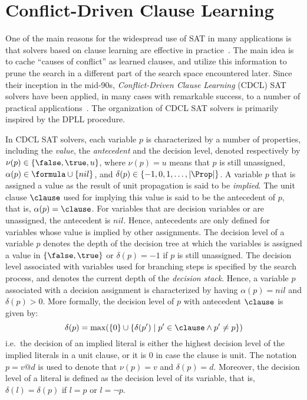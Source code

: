 \section{Conflict-Driven Clause Learning}%
\label{sec:cdcl}

One of the main reasons for the widespread use of SAT in many applications is
that solvers based on clause learning are effective in
practice~\cite{satchapter}. The main idea is to cache ``causes of conflict'' as
learned clauses, and utilize this information to prune the search in a different
part of the search space encountered later. Since their inception in the
mid-90s, \emph{Conflict-Driven Clause Learning} (CDCL) SAT solvers have been
applied, in many cases with remarkable success, to a number of practical
applications~\cite{cdclchapter}. The organization of CDCL SAT solvers is
primarily inspired by the DPLL procedure.

In CDCL SAT solvers, each variable $p$ is characterized by a number of
properties, including the \emph{value}, the \emph{antecedent} and the
decision level, denoted respectively by $\nu(p) \in \{\false, \true, u\}$, where
$\nu(p) = u$ means that $p$ is still unassigned, $\alpha(p) \in \formula \cup
\{nil\}$, and $\delta(p) \in \{-1, 0, 1, \ldots, |\Prop|\}$. A variable $p$ that
is assigned a value as the result of unit propagation is said to be
\emph{implied}.  The unit clause $\clause$ used for implying this value is said
to be the antecedent of $p$, that is, $\alpha(p) = \clause$. For variables that
are decision variables or are unassigned, the antecedent is $nil$. Hence,
antecedents are only defined for variables whose value is implied by other
assignments. The decision level of a variable $p$ denotes the depth of the
decision tree at which the variables is assigned a value in $\{\false, \true\}$
or $\delta(p) = -1$ if $p$ is still unassigned. The decision level associated
with variables used for branching steps is specified by the search process, and
denotes the current depth of the \emph{decision stack}. Hence, a variable $p$
associated with a decision assignment is characterized by having $\alpha(p) =
nil$ and $\delta(p) > 0$. More formally, the decision level of $p$ with
antecedent $\clause$ is given by: 
\begin{equation}
    \delta(p) = \max(\{0\} \cup \{\delta(p') \mid p' \in \clause \land p' \neq p\})
\end{equation}
i.e.\ the decision of an implied literal is either the highest decision level of
the implied literals in a unit clause, or it is 0 in case the clause is unit.
The notation $p = v @ d$ is used to denote that $\nu(p) = v$ and $\delta(p) =
d$. Moreover, the decision level of a literal is defined as the decision level
of its variable, that is, $\delta(l) = \delta(p)$ if $l = p$ or $l = \neg p$.

